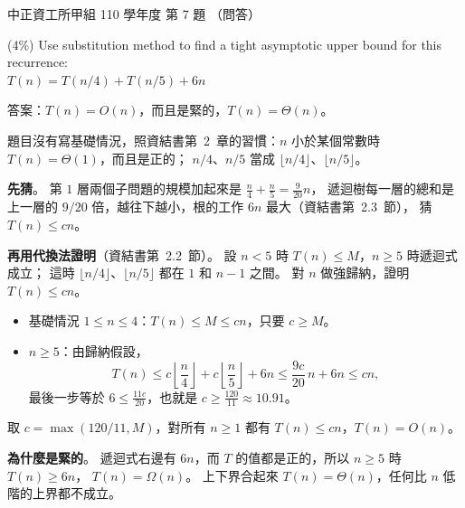 \begin{pastexam}[label={px:ccu-110-swa-05}]{中正資工所甲組 110 學年度 第 7 題}
（問答）

(4\%) Use substitution method to find a tight asymptotic upper bound for this recurrence:\\
$T(n)=T(n/4)+T(n/5)+6n$
\end{pastexam}

\begin{pastsoln}
答案：$T(n) = O(n)$，而且是緊的，$T(n) = \Theta(n)$。

題目沒有寫基礎情況，照資結書第~2~章的習慣：$n$ 小於某個常數時 $T(n) = \Theta(1)$，而且是正的；
$n/4$、$n/5$ 當成 $\lfloor n/4 \rfloor$、$\lfloor n/5 \rfloor$。

\textbf{先猜}。 第 $1$ 層兩個子問題的規模加起來是 $\frac{n}{4} + \frac{n}{5} = \frac{9}{20}n$，
遞迴樹每一層的總和是上一層的 $9/20$ 倍，越往下越小，根的工作 $6n$ 最大（資結書第~2.3~節），
猜 $T(n) \le cn$。

\textbf{再用代換法證明}（資結書第~2.2~節）。 設 $n < 5$ 時 $T(n) \le M$，$n \ge 5$ 時遞迴式成立；
這時 $\lfloor n/4 \rfloor$、$\lfloor n/5 \rfloor$ 都在 $1$ 和 $n - 1$ 之間。 對 $n$ 做強歸納，證明
$T(n) \le cn$。
\begin{itemize}
\item 基礎情況 $1 \le n \le 4$：$T(n) \le M \le cn$，只要 $c \ge M$。
\item $n \ge 5$：由歸納假設，
\[
T(n) \le c \left\lfloor \frac{n}{4} \right\rfloor + c \left\lfloor \frac{n}{5} \right\rfloor
+ 6n \le \frac{9c}{20}\, n + 6n \le cn ,
\]
最後一步等於 $6 \le \frac{11c}{20}$，也就是 $c \ge \frac{120}{11} \approx 10.91$。
\end{itemize}
取 $c = \max(120/11, M)$，對所有 $n \ge 1$ 都有 $T(n) \le cn$，$T(n) = O(n)$。

\textbf{為什麼是緊的}。 遞迴式右邊有 $6n$，而 $T$ 的值都是正的，所以 $n \ge 5$ 時 $T(n) \ge 6n$，
$T(n) = \Omega(n)$。 上下界合起來 $T(n) = \Theta(n)$，任何比 $n$ 低階的上界都不成立。
\end{pastsoln}
